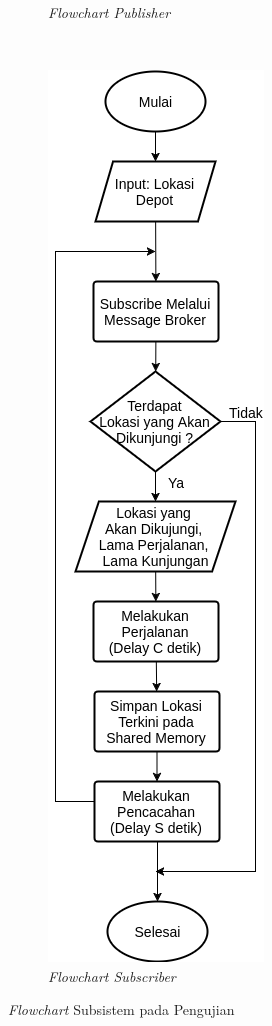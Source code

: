 \begin{figure}[!]
\begin{subfigure}[t]{0.39\textwidth}
		\caption{\textit{Flowchart Publisher}}
		\label{fig:test-flowchart-normal-global-publisher}
	\end{subfigure}%
	~
	\begin{subfigure}[t]{0.31\textwidth}
		\centering
		\includegraphics[width=\textwidth]{Resources/Images/test-flowchart-normal-global-subscriber}
		\caption{\textit{Flowchart Subscriber}}
		\label{fig:test-flowchart-normal-global-subscriber}
	\end{subfigure}
	\caption{\textit{Flowchart} Subsistem pada Pengujian}
	\label{fig:test-flowchart-normal-global}
\end{figure}


